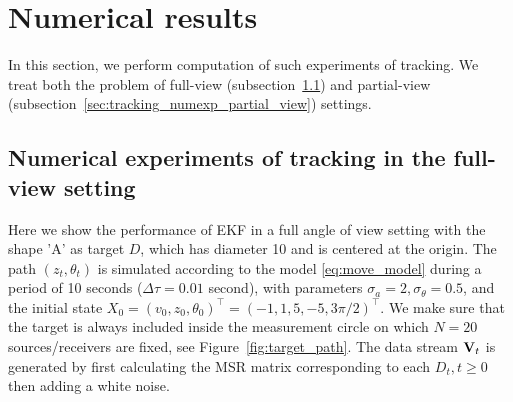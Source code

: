 \section{Numerical results}

In this section, we perform computation of such experiments of tracking.
We treat both the problem of full-view (subsection~\ref{sec:tracking_numexp_full_view})
and partial-view (subsection~\ref{sec:tracking_numexp_partial_view}) settings.

\subsection{Numerical experiments of tracking in the full-view setting}
\label{sec:tracking_numexp_full_view}



Here we show the performance of EKF in a full angle of view
setting with the shape 'A' as target $D$, which has diameter 10
and is centered at the origin. The path $(z_t, \theta_t)$ is
simulated according to the model \eqref{eq:move_model} during a
period of 10 seconds ($\Delta \tau=0.01$ second), with parameters
$\sigma_a=2, \sigma_\theta=0.5$, and the initial state $X_0=
(v_0,z_0,\theta_0)^\top =(-1, 1, 5, -5, 3\pi/2)^\top$. We make
sure that the target is always included inside the measurement
circle on which $N=20$ sources/receivers are fixed, see
Figure~\ref{fig:target_path}. The data stream $\mathbf{V}_t$ is generated
by first calculating the MSR matrix corresponding to each $D_t,
t\geq 0$ then adding a white noise.



